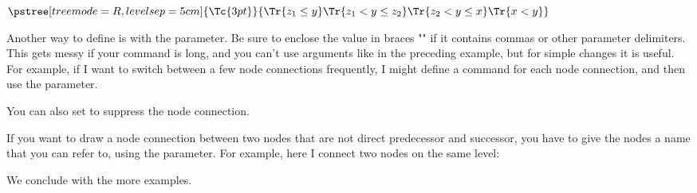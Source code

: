 \documentclass[fontsize=11pt,english,BCOR=10mm,DIV=12,bibliography=totoc,parskip=false,
   headings=small, headinclude=false,footinclude=false,oneside]{pst-doc}
\begin{document}
\begin{LTXexample}
$
\def\psedge#1#2{\ncdiagg[angleA=180,armA=1cm,nodesep=4pt]{#2}{#1}}
\pstree[treemode=R, levelsep=5cm]{\Tc{3pt}}{%
  \Tr{z_1\leq y}  \Tr{z_1<y\leq z_2}   \Tr{z_2<y\leq x}   \Tr{x<y}
}
$
\end{LTXexample}

Another way to define \Largb{} is with the 
parameter. Be sure to enclose the value in braces "{}" if it contains commas
or other parameter delimiters. This gets messy if your command is long, and
you can't use arguments like in the preceding example, but for simple changes
it is useful. For example, if I want to switch between a few node connections
frequently, I might define a command for each node connection, and then use
the  parameter.

\begin{LTXexample}[pos=l,width=0.4\linewidth]
  \def\dedge{\ncline[linestyle=dashed]}
  \pstree[treemode=U,radius=2pt]{\Tc{3pt}}{%
    \TC*[edge=\dedge]
    \pstree{\Tc{3pt}}{\TC*[edge=\dedge] \TC*}
    \TC*}
\end{LTXexample}

You can also set  to suppress the node connection.

If you want to draw a node connection between two nodes that are not direct
predecessor and successor, you have to give the nodes a name that you can
refer to, using the  parameter. For example, here I connect two nodes
on the same level:

\begin{LTXexample}[pos=l,width=0.4\linewidth]
\end{LTXexample}

We conclude with the more examples.

\begin{LTXexample}[pos=l,width=0.4\linewidth]
  \def\psedge{\nccurve[angleB=180, nodesepB=3pt]}
\end{LTXexample}

\begin{LTXexample}[pos=l,width=0.4\linewidth]
\end{LTXexample}
\end{document}
